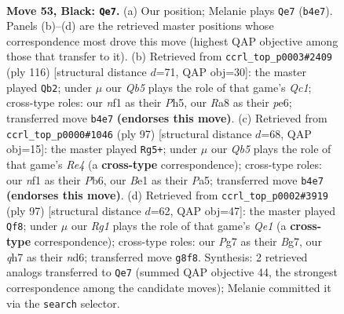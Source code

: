 \documentclass[11pt]{article}
\begin{document}
\clearpage

\begin{figure}[p]\centering
\begin{subfigure}{0.46\textwidth}\centering
\resizebox{\linewidth}{!}{%
\newchessgame
\chessboard[
  setfen={r5r1/p2k2pQ/7p/3p3P/pq1P2P1/4P3/7K/4bN2 b - - 15 53},
  showmover=false,
  pgfstyle=straightmove, color=movearrow, markmove={b4-e7}
]}
\caption{}
\end{subfigure}\hfill
\begin{subfigure}{0.46\textwidth}\centering
\resizebox{\linewidth}{!}{%
\newchessgame
\chessboard[
  setfen={2r5/6pk/1pP1p3/1P2p2P/1q1pP3/R4P2/K7/2Q5 w - - 3 59},
  showmover=false,
  pgfstyle=straightmove, color=movearrow, markmove={c1-b2}
]}
\caption{}
\end{subfigure}
\\[4pt]
\begin{subfigure}{0.46\textwidth}\centering
\resizebox{\linewidth}{!}{%
\newchessgame
\chessboard[
  setfen={8/1p5Q/1p1p1k2/pP1Pr2p/P1PN1p1r/8/8/6K1 b - - 11 49},
  showmover=false,
  pgfstyle=straightmove, color=movearrow, markmove={e5-g5}
]}
\caption{}
\end{subfigure}\hfill
\begin{subfigure}{0.46\textwidth}\centering
\resizebox{\linewidth}{!}{%
\newchessgame
\chessboard[
  setfen={1r2q3/2Q3bk/3N4/4p3/1p2Pp2/3P4/3B1PP1/5K2 b - - 3 49},
  showmover=false,
  pgfstyle=straightmove, color=movearrow, markmove={e8-f8}
]}
\caption{}
\end{subfigure}
\caption{\textbf{Move 53, Black: \texttt{Qe7}.} (a) Our position; Melanie plays \texttt{Qe7} (\texttt{b4e7}). Panels (b)--(d) are the retrieved master positions whose correspondence most drove this move (highest QAP objective among those that transfer to it). (b) Retrieved from \texttt{ccrl\_top\_p0003\#2409} (ply 116) [structural distance $d$=71, QAP obj=30]: the master played \texttt{Qb2}; under $\mu$ our \emph{Qb5} plays the role of that game's \emph{Qc1}; cross-type roles: our \emph{n}f1 as their \emph{P}h5, our \emph{R}a8 as their \emph{p}e6; transferred move \texttt{b4e7} \textbf{(endorses this move)}. (c) Retrieved from \texttt{ccrl\_top\_p0000\#1046} (ply 97) [structural distance $d$=68, QAP obj=15]: the master played \texttt{Rg5+}; under $\mu$ our \emph{Qb5} plays the role of that game's \emph{Re4} (a \textbf{cross-type} correspondence); cross-type roles: our \emph{n}f1 as their \emph{P}b6, our \emph{B}e1 as their \emph{P}a5; transferred move \texttt{b4e7} \textbf{(endorses this move)}. (d) Retrieved from \texttt{ccrl\_top\_p0002\#3919} (ply 97) [structural distance $d$=62, QAP obj=47]: the master played \texttt{Qf8}; under $\mu$ our \emph{Rg1} plays the role of that game's \emph{Qe1} (a \textbf{cross-type} correspondence); cross-type roles: our \emph{P}g7 as their \emph{B}g7, our \emph{q}h7 as their \emph{n}d6; transferred move \texttt{g8f8}. Synthesis: 2 retrieved analogs transferred to \texttt{Qe7} (summed QAP objective 44, the strongest correspondence among the candidate moves); Melanie committed it via the \texttt{search} selector.}
\label{fig:thought-m105}
\end{figure}
\end{document}
